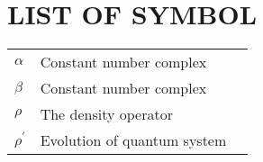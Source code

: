 \chapter*{LIST OF SYMBOL}
\begin{longtable}{lll}
$\alpha$            & Constant number complex\\
$\beta$             & Constant number complex\\
$\rho$              & The density operator\\
$\rho^\prime$       & Evolution of quantum system\\

\end{longtable}

